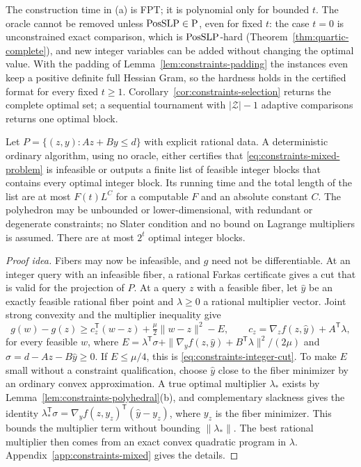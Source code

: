 The construction time in (a) is FPT; it is polynomial only for bounded $t$.
The oracle cannot be removed unless $\mathrm{PosSLP}\in\mathrm P$, even for fixed $t$:
the case $t=0$ is unconstrained exact comparison, which is $\mathrm{PosSLP}$-hard
(Theorem~\ref{thm:quartic-complete}), and new integer variables can be added
without changing the optimal value. With the padding of
Lemma~\ref{lem:constraints-padding} the instances even keep a positive
definite full Hessian Gram, so the hardness holds in the certified format for
every fixed $t\ge1$. Corollary~\ref{cor:constraints-selection}
returns the complete optimal set; a sequential tournament with $|\mathcal Z|-1$
adaptive comparisons returns one optimal block.

\begin{theorem}
\label{thm:constraints-mixed-candidates}
Let $P=\{(z,y):Az+By\le d\}$ with explicit rational data. A deterministic
ordinary algorithm, using no oracle, either certifies that
\eqref{eq:constraints-mixed-problem} is infeasible or outputs a finite list of
feasible integer blocks that contains every optimal integer block. Its running
time and the total length of the list are at most $F(t)L^{C}$ for a computable
$F$ and an absolute constant $C$. The polyhedron may be unbounded or
lower-dimensional, with redundant or degenerate constraints; no Slater
condition and no bound on Lagrange multipliers is assumed. There are at most
$2^t$ optimal integer blocks.
\end{theorem}

\begin{proof}[Proof idea]
Fibers may now be infeasible, and $g$ need not be differentiable. At an
integer query with an infeasible fiber, a rational Farkas certificate gives a
cut that is valid for the projection of $P$. At a query $z$ with a feasible
fiber, let $\hat y$ be an exactly feasible rational fiber point and
$\lambda\ge0$ a rational multiplier vector. Joint strong convexity and the
multiplier inequality give
\[
 g(w)-g(z)\ge c_z^{\mathsf T}(w-z)+\tfrac\mu2\|w-z\|^2-E,\qquad
 c_z=\nabla_zf(z,\hat y)+A^{\mathsf T}\lambda,
\]
for every feasible $w$, where
$E=\lambda^{\mathsf T}\sigma+\|\nabla_yf(z,\hat y)+B^{\mathsf T}\lambda\|^2/(2\mu)$
and $\sigma=d-Az-B\hat y\ge0$. If $E\le\mu/4$, this is
\eqref{eq:constraints-integer-cut}. To make $E$ small without a constraint
qualification, choose $\hat y$ close to the fiber minimizer by an ordinary
convex approximation. A true optimal multiplier $\lambda_*$ exists by
Lemma~\ref{lem:constraints-polyhedral}(b), and complementary slackness gives
the identity
$\lambda_*^{\mathsf T}\sigma=\nabla_yf(z,y_z)^{\mathsf T}(\hat y-y_z)$, where
$y_z$ is the fiber minimizer. This bounds the multiplier term without bounding
$\|\lambda_*\|$. The best rational multiplier then comes from an exact convex
quadratic program in $\lambda$. Appendix~\ref{app:constraints-mixed} gives the
details.
\end{proof}

